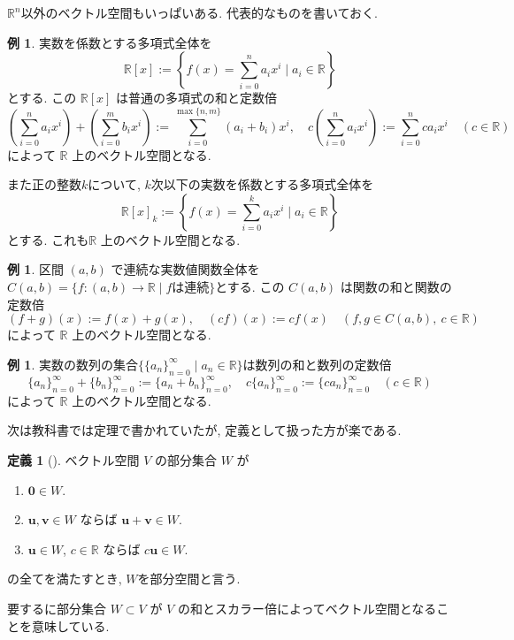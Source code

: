 \documentclass[dvipdfmx,a4paper,11pt]{article} %
\newcommand{\R}{\mathbb{R}}
\theoremstyle{definition}
\newtheorem{defn}[thm]{定義}
\newtheorem{ex}[thm]{例}
\begin{document}
$\R^n$以外のベクトル空間もいっぱいある.
代表的なものを書いておく.

\begin{ex}
実数を係数とする多項式全体を 
$$
\mathbb{R}[x]
:=\left\{ f(x) = \sum_{i=0}^{n} a_i x^i \mid a_i\in \R\right\}
$$ 
とする. この $\mathbb{R}[x]$ は普通の多項式の和と定数倍
$$
\left(\sum_{i=0}^{n} a_i x^i\right)
+
\left(\sum_{i=0}^{m} b_i x^i\right)
:=
\sum_{i=0}^{\max\{n,m\}}(a_i+b_i)x^i,
\quad
c\left(\sum_{i=0}^{n} a_i x^i\right)
:=
\sum_{i=0}^{n} ca_i x^i
\quad (c\in\R)
$$
によって $\mathbb{R}$ 上のベクトル空間となる.

また正の整数$k$について, $k$次以下の実数を係数とする多項式全体を
$$
\mathbb{R}[x]_{k}
:=\left\{ f(x) = \sum_{i=0}^{k} a_i x^i \mid a_i\in \R\right\}
$$
とする. これも$\mathbb{R}$ 上のベクトル空間となる.
\end{ex}

\begin{ex}
区間 $(a,b)$ で連続な実数値関数全体を\(C(a,b) =\{ f : (a,b) \to \R\mid \text{$f$は連続}\}\)とする. この \(C(a,b)\) は関数の和と関数の定数倍
$$
(f+g)(x)
:=
f(x)+g(x),
\quad
(cf)(x)
:=
cf(x)
\quad
(f,g\in C(a,b),\ c\in\R)
$$
によって $\mathbb{R}$ 上のベクトル空間となる.
\end{ex}

\begin{ex}
実数の数列の集合\(\{ \{a_n\}_{n=0}^{\infty} \mid a_n\in \R\}\)は数列の和と数列の定数倍
$$
\{a_n\}_{n=0}^{\infty}+\{b_n\}_{n=0}^{\infty}
:=
\{a_n+b_n\}_{n=0}^{\infty},
\quad 
c\{a_n\}_{n=0}^{\infty}
:=
\{ca_n\}_{n=0}^{\infty}
\quad (c\in\R)
$$
によって $\mathbb{R}$ 上のベクトル空間となる.
\end{ex}

次は教科書では定理で書かれていたが, 定義として扱った方が楽である. 
\begin{defn}[{\cite[定理4.1.1]{M}}]
ベクトル空間 $V$ の部分集合 $W$ が
\begin{enumerate}
\item[(i)] $\bm{0}\in W$.
\item[(ii)] $\bm{u},\bm{v}\in W$ ならば $\bm{u}+\bm{v}\in W$.
\item[(iii)] $\bm{u}\in W$, $c\in\mathbb{R}$ ならば $c\bm{u}\in W$.
\end{enumerate}
の全てを満たすとき, $W$を部分空間と言う. 
\end{defn}
要するに部分集合 $W \subset V$ が $V$ の和とスカラー倍によってベクトル空間となることを意味している. 
\end{document}
